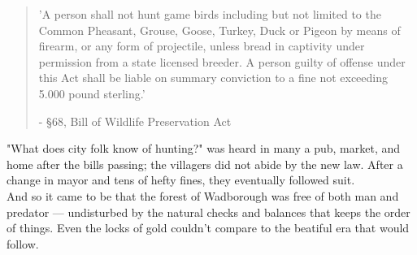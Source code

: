 \begin{localsize}{10}
\begin{quote}
'A person shall not hunt game birds including but not limited to the Common Pheasant, Grouse, Goose, Turkey, Duck or Pigeon by means of firearm, or any form of projectile, unless bread in captivity under permission from a state licensed breeder. A person guilty of offense under this Act shall be liable on summary conviction to a fine not exceeding 5.000 pound sterling.'
\begin{flushright}- §68, Bill of Wildlife Preservation Act\end{flushright}
\end{quote} 
\end{localsize}

"What does city folk know of hunting?" was heard in many a pub, market, and home after the bills passing; the villagers did not abide by the new law. After a change in mayor and tens of hefty fines, they eventually followed suit.\\

And so it came to be that the forest of Wadborough was free of both man and predator — undisturbed by the natural checks and balances that keeps the order of things. Even the locks of gold couldn't compare to the beatiful era that would follow.